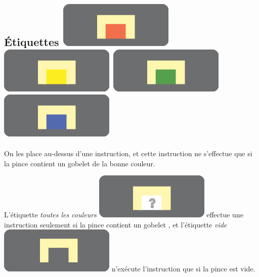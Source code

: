 \documentclass[a4paper]{article}
\begin{document}
\begin{minipage}{6cm}
\subsection*{\'Etiquettes
  \includegraphics[height=.5\baselineskip]{red}
 \includegraphics[height=.5\baselineskip]{yellow} 
\includegraphics[height=.5\baselineskip]{green}
 \includegraphics[height=.5\baselineskip]{blue}
}
\vspace{-0.2cm}

On les
place au-dessus d'une instruction, et cette instruction ne s'effectue
que si la pince contient un gobelet de la bonne couleur.

L'\'etiquette
  {\it toutes les couleurs} \includegraphics[height=.5\baselineskip]{any} effectue une instruction seulement si
  la pince contient un gobelet%
, et
  l'\'etiquette {\it vide} \includegraphics[height=.5\baselineskip]{none} n'ex\'ecute l'instruction que si la pince est
  vide.



\end{minipage}
\end{document}
